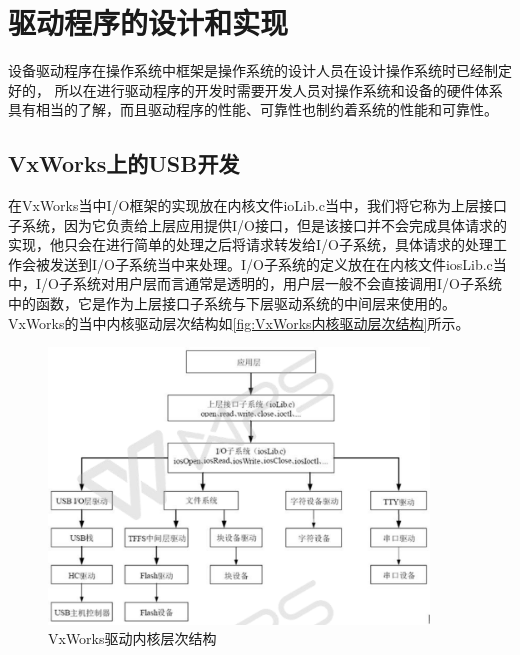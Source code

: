 \chapter{驱动程序的设计和实现}
	
	设备驱动程序在操作系统中框架是操作系统的设计人员在设计操作系统时已经制定好的，	所以在进行驱动程序的开发时需要开发人员对操作系统和设备的硬件体系具有相当的了解，而且驱动程序的性能、可靠性也制约着系统的性能和可靠性。	


\section{VxWorks上的USB开发}\label{sec:USB开发}
	在VxWorks当中I/O框架的实现放在内核文件ioLib.c当中，我们将它称为上层接口子系统，因为它负责给上层应用提供I/O接口，但是该接口并不会完成具体请求的实现，他只会在进行简单的处理之后将请求转发给I/O子系统，具体请求的处理工作会被发送到I/O子系统当中来处理。I/O子系统的定义放在在内核文件iosLib.c当中，I/O子系统对用户层而言通常是透明的，用户层一般不会直接调用I/O子系统中的函数，它是作为上层接口子系统与下层驱动系统的中间层来使用的。VxWorks的当中内核驱动层次结构如\autoref{fig:VxWorks内核驱动层次结构}所示。	

\begin{figure}[!h]
\centering
\includegraphics[width=0.9\textwidth]{./graphics/vxworks-kernel-diagram.pdf}
\caption{VxWorks驱动内核层次结构}\label{fig:VxWorks内核驱动层次结构}
\end{figure}	
			
